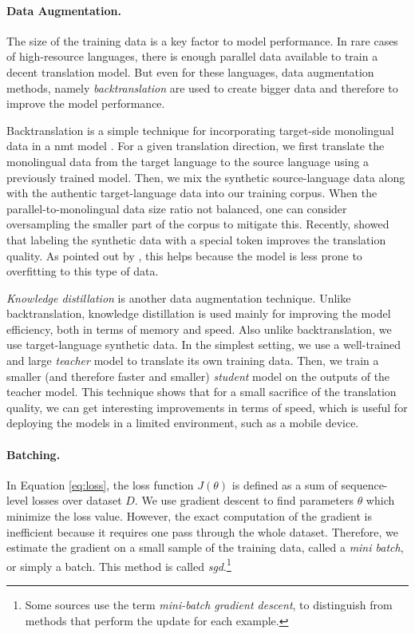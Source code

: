 \paragraph{Data Augmentation.} The size of the training data is a key factor to
model performance. In rare cases of high-resource languages, there is enough
parallel data available to train a decent translation model. But even for these
languages, data augmentation methods, namely \emph{backtranslation} are used
to create bigger data and therefore to improve the model performance.

Backtranslation is a simple technique for incorporating target-side monolingual
data in a \ac{nmt} model \citep{sennrich-etal-2016-improving}. For a given
translation direction, we first translate the monolingual data from the target
language to the source language using a previously trained model. Then, we mix
the synthetic source-language data along with the authentic target-language
data into our training corpus. When the parallel-to-monolingual data size ratio
not balanced, one can consider oversampling the smaller part of the corpus to
mitigate this. Recently, \citet{caswell-etal-2019-tagged} showed that labeling
the synthetic data with a special token improves the translation quality. As
pointed out by \citet{marie-etal-2020-tagged}, this helps because the model is
less prone to overfitting to this type of data.

\emph{Knowledge distillation} \citep{kim-rush-2016-sequence} is another data
augmentation technique. Unlike backtranslation, knowledge distillation is used
mainly for improving the model efficiency, both in terms of memory and speed.
Also unlike backtranslation, we use target-language synthetic data. In the
simplest setting, we use a well-trained and large \emph{teacher} model to
translate its own training data. Then, we train a smaller (and therefore faster
and smaller) \emph{student} model on the outputs of the teacher model. This
technique shows that for a small sacrifice of the translation quality, we can
get interesting improvements in terms of speed, which is useful for deploying
the models in a limited environment, such as a mobile device.

\paragraph{Batching.} In Equation \ref{eq:loss}, the loss function $J(\theta)$
is defined as a sum of sequence-level losses over dataset $D$. We use gradient
descent to find parameters $\theta$ which minimize the loss value. However, the
exact computation of the gradient is inefficient because it requires one pass
through the whole dataset. Therefore, we estimate the gradient on a small
sample of the training data, called a \emph{mini batch}, or simply a
batch. This method is called \emph{\ac{sgd}}.\footnote{Some sources use the
  term \emph{mini-batch gradient descent}, to distinguish from methods that
  perform the update for each example.}

